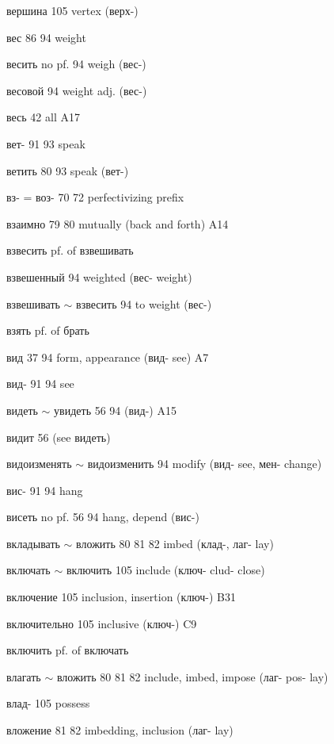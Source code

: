 \clearpage
\thispagestyle{plain}
\begingroup
\cyrillicfont
\fontsize{7.25}{8.25}\selectfont
\setlength{\parindent}{0pt}
\setlength{\parskip}{0pt}
\setlength{\emergencystretch}{1.5em}
\noindent
\begin{minipage}[t]{0.475\textwidth}
\raggedright
\noindent вершина 105 vertex (верх-)\par
\noindent вес 86 94 weight\par
\noindent весить no pf. 94 weigh (вес-)\par
\noindent весовой 94 weight adj. (вес-)\par
\noindent весь 42 all A17\par
\noindent вет- 91 93 speak\par
\noindent *ветить 80 93 speak (вет-)\par
\noindent вз- = воз- 70 72 perfectivizing prefix\par
\noindent взаимно 79 80 mutually (back and forth) A14\par
\noindent взвесить pf. of взвешивать\par
\noindent взвешенный 94 weighted (вес- weight)\par
\noindent взвешивать $\sim$ взвесить 94 to weight (вес-)\par
\noindent взять pf. of брать\par
\noindent вид 37 94 form, appearance (вид- see) A7\par
\noindent вид- 91 94 see\par
\noindent видеть $\sim$ увидеть 56 94 (вид-) A15\par
\noindent видит 56 (see видеть)\par
\noindent видоизменять $\sim$ видоизменить 94 modify (вид- see, мен- change)\par
\noindent вис- 91 94 hang\par
\noindent висеть no pf. 56 94 hang, depend (вис-)\par
\noindent вкладывать $\sim$ вложить 80 81 82 imbed (клад-, лаг- lay)\par
\noindent включать $\sim$ включить 105 include (ключ- clud- close)\par
\noindent включение 105 inclusion, insertion (ключ-) B31\par
\noindent включительно 105 inclusive (ключ-) C9\par
\noindent включить pf. of включать\par
\noindent влагать $\sim$ вложить 80 81 82 include, imbed, impose (лаг- pos- lay)\par
\noindent влад- 105 possess\par
\noindent вложение 81 82 imbedding, inclusion (лаг- lay)\par
\end{minipage}\hfill
